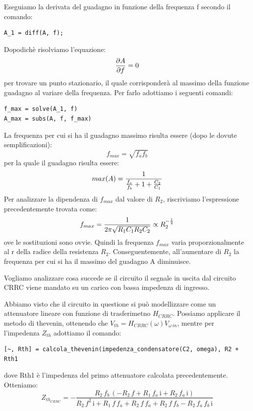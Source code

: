 Eseguiamo la derivata del guadagno in funzione della frequenza f secondo il comando:
\begin{lstlisting}[frame=single]
A_1 = diff(A, f);
\end{lstlisting}
Dopodichè risolviamo l'equazione:
\begin{equation}
    {{\partial A} \over{\partial f}} = 0
\end{equation}
per trovare un punto stazionario, il quale corrisponderà al massimo della funzione guadagno al variare della frequenza.
Per farlo adottiamo i seguenti comandi:
\begin{lstlisting}[frame=single]
f_max = solve(A_1, f)
A_max = subs(A, f, f_max)
\end{lstlisting}
La frequenza per cui si ha il guadagno massimo risulta essere (dopo le dovute semplificazioni):
\begin{equation}
    f_{max} = \sqrt{f_a f_b}
\end{equation}
per la quale il guadagno risulta essere:
\begin{equation}
    max(A) = {1\over{ {f_a\over{f_b}} + 1 + {C_2\over{C_1}}}}
\end{equation}
Per analizzare la dipendenza di $f_{max}$ dal valore di $R_2$, riscriviamo l'espressione precedentemente trovata come:
\begin{equation}
    f_{max} = {1 \over{2 \pi \sqrt{R_1 C_1 R_2 C_2}}} \propto R_2^{-{1\over{2}}}
\end{equation}
ove le sostituzioni sono ovvie. Quindi la frequenza $f_{max}$ varia proporzionalmente al r della radice della resistenza $R_2$. Conseguentemente, all'aumentare di $R_2$ la frequenza per cui si ha il massimo del guadagno A diminuisce.

Vogliamo analizzare cosa succede se il circuito il segnale in uscita dal circuito CRRC viene mandato su un carico con bassa impedenza di ingresso.  

Abbiamo visto che il circuito in questione si può modellizzare come un attenuatore lineare con funzione di trasferimetno $H_{CRRC}$. Possiamo applicare il metodo di thevenin, ottenendo che $V_{th} = H_{CRRC}(\omega)V_{\omega \, in}$, mentre per l'impedenza $Z_{th}$ adottiamo il comando:
\begin{lstlisting}[frame=single]
[~, Rth] = calcola_thevenin(impedenza_condensatore(C2, omega), R2 + Rth1
\end{lstlisting}
dove Rth1 è l'impedenza del primo attenuatore calcolata precedentemente. Otteniamo:
\begin{equation}
    Z_{th_{CRRC}} = -\frac{R_2 \,f_b \,{\left(-R_2 \,f+R_1 \,f_a \,\mathrm{i}+R_2 \,f_a \,\mathrm{i}\right)}}{R_2 \,f^2 \,\mathrm{i}+R_1 \,f\,f_a +R_2 \,f\,f_a +R_2 \,f\,f_b -R_2 \,f_a \,f_b \,\mathrm{i}}
\end{equation}

